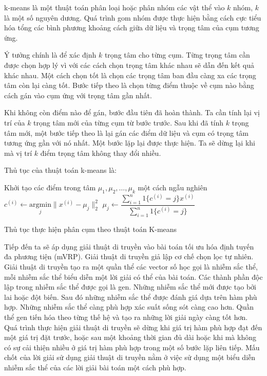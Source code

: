 \documentclass[14pt, a4paper]{article}
\numberwithin{equation}{section}
\numberwithin{figure}{section}
\numberwithin{dl}{section}
\numberwithin{md}{section}
\numberwithin{bd}{section}
\numberwithin{dn}{section}
\numberwithin{hq}{section}
\begin{document}
    k-means là một thuật toán phân loại hoặc phân nhóm các vật thể vào $k$ nhóm, $k$ là một số nguyên dương.
    Quá trình gom nhóm được thực hiện bằng cách cực tiểu hóa tổng các bình phương khoảng cách giữa dữ liệu và trọng tâm của cụm tương ứng.

    Ý tưởng chính là để xác định $k$ trọng tâm cho từng cụm. Từng trọng tâm cần được chọn hợp lý vì với các cách chọn trọng tâm khác nhau sẽ dẫn đến kết quả khác nhau.
    Một cách chọn tốt là chọn các trọng tâm ban đầu càng xa các trọng tâm còn lại càng tốt.
    Bước tiếp theo là chọn từng điểm thuộc về cụm nào bằng cách gán vào cụm ứng với trọng tâm gần nhất.
    
    Khi không còn điểm nào để gán, bước đầu tiên đã hoàn thành.
    Ta cần tính lại vị trí của $k$ trọng tâm mới của từng cụm từ bước trước.
    Sau khi đã tính $k$ trọng tâm mới, một bước tiếp theo là lại gán các điểm dữ liệu và cụm có trọng tâm tương ứng gần với nó nhất.
    Một bước lặp lại được thực hiện. Ta sẽ dừng lại khi mà vị trí $k$ điểm trọng tâm không thay đổi nhiều.

    Thủ tục của thuật toán k-means là:

    \begin{algorithm}[h!]
        \DontPrintSemicolon
        Khởi tạo các điểm trong tâm $\mu_1, \mu_2, \dots, \mu_k$ một cách ngẫu nghiên\;
         {
             {
                $c^{(i)} \gets \underset{j}{\mathrm{argmin}} \lVert x^{(i)} - \mu_j \rVert_2^2$\;
            }
             {
                $\mu_j \gets \dfrac{\sum_{i=1}^n 1\lbrace c^{(i)} = j \rbrace x^{(i)}}{\sum_{i=1}^n 1\lbrace c^{(i)} = j \rbrace}$\;
            }
        }
        \;
        \caption{Thủ tục thực hiện phân cụm theo thuật toán K-means}
    \end{algorithm}

    Tiếp đến ta sẽ áp dụng giải thuật di truyền vào bài toán tối ưu hóa định tuyến đa phương tiện (mVRP).
    Giải thuật di truyền giả lập cơ chế chọn lọc tự nhiên.
    Giải thuật di truyền tạo ra một quần thể các vector số học gọi là nhiễm sắc thể,
    mỗi nhiễm sắc thể biểu diễn một lời giải có thể của bài toán.
    Các thành phần độc lập trong nhiễm sắc thể được gọi là gen.
    Những nhiễm sắc thể mới được tạo bởi lai hoặc đột biến.
    Sau đó những nhiễm sắc thể được đánh giá dựa trên hàm phù hợp.
    Những nhiễm sắc thể càng phù hợp xác suất sống sót càng cao hơn.
    Quần thể gen tiến hóa theo từng thế hệ và tạo ra những lời giải ngày càng tốt hơn.
    Quá trình thực hiện giải thuật di truyền sẽ dừng khi giá trị hàm phù hợp đạt đến một giá trị đặt trước,
    hoặc sau một khoảng thời gian đủ dài hoặc khi mà không có sự cải thiện nhiều ở giá trị hàm phù hợp trong một số bước lặp liên tiếp.
    Mấu chốt của lời giải sử dụng giải thuật di truyền nằm ở việc sử dụng một biểu diễn nhiễm sắc thể của các lời giải bài toán một cách phù hợp.
\end{document}
